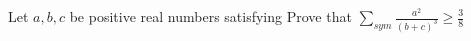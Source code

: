 Let $a,b,c$ be positive real numbers satisfying Prove that $\sum_{sym} \frac{a^{2}}{(b+c)^{3}}\geq \frac{3}{8}$